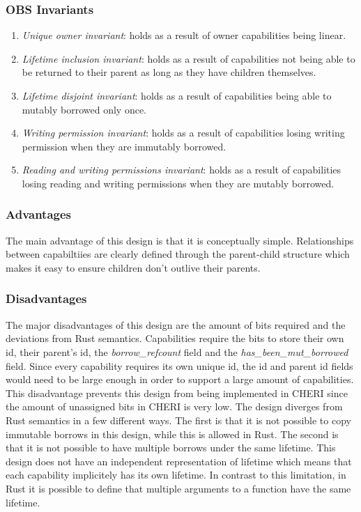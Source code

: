 \subsubsection{OBS Invariants}
\begin{enumerate}
    \item \textit{Unique owner invariant}: holds as a result of owner capabilities being linear.
    \item \textit{Lifetime inclusion invariant}: holds as a result of capabilities not being able to be returned to their parent as long as they have children themselves.
    \item \textit{Lifetime disjoint invariant}: holds as a result of capabilities being able to mutably borrowed only once.
    \item \textit{Writing permission invariant}: holds as a result of capabilities losing writing permission when they are immutably borrowed.
    \item \textit{Reading and writing permissions invariant}: holds as a result of capabilities losing reading and writing permissions when they are mutably borrowed.
\end{enumerate}

\subsubsection{Advantages}
The main advantage of this design is that it is conceptually simple. Relationships between capabiltiies are clearly defined through the parent-child structure which makes it easy to ensure children don't outlive their parents.

\subsubsection{Disadvantages}
The major disadvantages of this design are the amount of bits required and the deviations from Rust semantics. Capabilities require the bits to store their own id, their parent's id, the \textit{borrow\_refcount} field and the \textit{has\_been\_mut\_borrowed} field. Since every capability requires its own unique id, the id and parent id fields would need to be large enough in order to support a large amount of capabilities. This disadvantage prevents this design from being implemented in CHERI since the amount of unassigned bits in CHERI is very low.
The design diverges from Rust semantics in a few different ways. The first is that it is not possible to copy immutable borrows in this design, while this is allowed in Rust. The second is that it is not possible to have multiple borrows under the same lifetime. This design does not have an independent representation of lifetime which means that each capability implicitely has its own lifetime. In contrast to this limitation, in Rust it is possible to define that multiple arguments to a function have the same lifetime.
